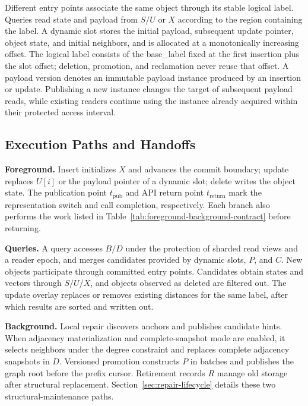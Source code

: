 \documentclass[sigconf,pbalance]{acmart}
\begin{document}
Different entry points associate the same object through its stable logical label. Queries read state and payload from \(S/U\) or \(X\) according to the region containing the label. A dynamic slot stores the initial payload, subsequent update pointer, object state, and initial neighbors, and is allocated at a monotonically increasing offset. The logical label consists of the base\_label fixed at the first insertion plus the slot offset; deletion, promotion, and reclamation never reuse that offset. A payload version denotes an immutable payload instance produced by an insertion or update. Publishing a new instance changes the target of subsequent payload reads, while existing readers continue using the instance already acquired within their protected access interval.

\subsection{Execution Paths and Handoffs}
\label{sec:end-to-end-ops}

\textbf{Foreground.} Insert initializes $X$ and advances the commit boundary; update replaces $U[i]$ or the payload pointer of a dynamic slot; delete writes the object state. The publication point $t_{\mathrm{pub}}$ and API return point $t_{\mathrm{return}}$ mark the representation switch and call completion, respectively. Each branch also performs the work listed in Table~\ref{tab:foreground-background-contract} before returning.

\textbf{Queries.} A query accesses $B/D$ under the protection of sharded read views and a reader epoch, and merges candidates provided by dynamic slots, $P$, and $C$. New objects participate through committed entry points. Candidates obtain states and vectors through $S/U/X$, and objects observed as deleted are filtered out. The update overlay replaces or removes existing distances for the same label, after which results are sorted and written out.

\textbf{Background.} Local repair discovers anchors and publishes candidate hints. When adjacency materialization and complete-snapshot mode are enabled, it selects neighbors under the degree constraint and replaces complete adjacency snapshots in $D$. Versioned promotion constructs $P$ in batches and publishes the graph root before the prefix cursor. Retirement records $R$ manage old storage after structural replacement. Section~\ref{sec:repair-lifecycle} details these two structural-maintenance paths.
\end{document}

